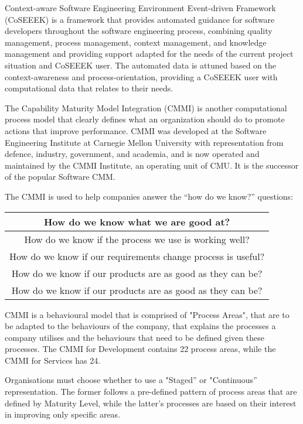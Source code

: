 \documentclass{article}
\begin{document}
Context-aware Software Engineering Environment Event-driven Framework (CoSEEEK) is a framework that provides automated guidance for software developers throughout the software engineering process, combining quality management, process management, context management, and knowledge management and providing support adapted for the needs of the current project situation and CoSEEEK user. The automated data is attuned based on the context-awareness and process-orientation, providing a CoSEEEK user with computational data that relates to their needs. \cite{coseeek} \newline

The Capability Maturity Model Integration (CMMI) is another computational process model that clearly defines what an organization should do to promote actions that improve performance. CMMI was developed at the Software Engineering Institute at Carnegie Mellon University with representation from defence, industry, government, and academia, and is now operated and maintained by the CMMI Institute, an operating unit of CMU. It is the successor of the popular Software CMM. \cite{cmmi} \newline

The CMMI is used to help companies answer the “how do we know?” questions: 

\begin{center}
\begin{tabular}{||c||} 
\hline How do we know what we are good at? \\ 
\hline
How do we know if the process we use is working well? \\ 
\hline
How do we know if our requirements change process is useful? \\
\hline
How do we know if our products are as good as they can be? \\
\hline
How do we know if our products are as good as they can be? \\
\hline
\end{tabular} \newline
\end{center} 
CMMI is a behavioural model that is comprised of "Process Areas", that are to be adapted to the behaviours of the company, that explains the processes a company utilises and the behaviours that need to be defined given these processes. The CMMI for Development contains 22 process areas, while the CMMI for Services has 24. \newline

Organisations must choose whether to use a "Staged'' or "Continuous'' representation. The former follows a pre-defined pattern of process areas that are defined by Maturity Level, while the latter’s processes are based on their interest in improving only specific areas. \newline
\end{document}
